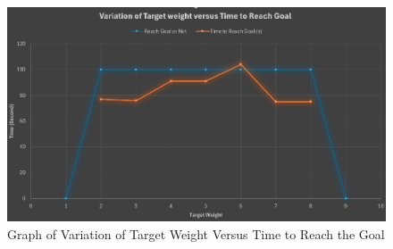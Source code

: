 \begin{figure}[H]
  \centering
  \includegraphics[width= 1.0\textwidth]{Figures/Target vs Time.PNG}
  \caption[Graph of Variation of Target Weight Versus Time to Reach the Goal ]{Graph of Variation of Target Weight Versus Time to Reach the Goal}
   \label{fig:Graph of Variation of Target Weight Versus Time to Reach the Goal} 
\end{figure}


